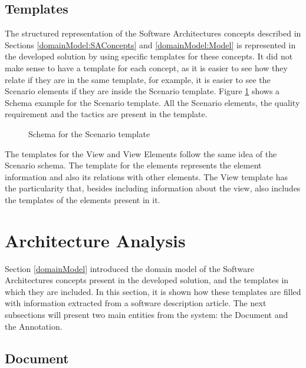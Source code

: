 \documentclass{llncs}
\begin{document}
\subsection{Templates}
\label{domainModel:templates}
The structured representation of the Software Architectures concepts described in Sections \ref{domainModel:SAConcepts} and \ref{domainModel:Model} is represented in the developed solution by using specific templates for these concepts. It did not make sense to have a template for each concept, as it is easier to see how they relate if they are in the same template, for example, it is easier to see the Scenario elements if they are inside the Scenario template. Figure \ref{figure:scenarioTemplate} shows a Schema example for the Scenario template. All the Scenario elements, the quality requirement and the tactics are present in the template.

\begin{figure}
\centering

\caption{Schema for the Scenario template}
\label{figure:scenarioTemplate}
\end{figure}

The templates for the View and View Elements follow the same idea of the Scenario schema. The template for the elements represents the element information and also its relations with other elements. The View template has the particularity that, besides including information about the view, also includes the templates of the elements present in it.

\section{Architecture Analysis}
\label{architecture}
Section \ref{domainModel} introduced the domain model of the Software Architectures concepts present in the developed solution, and the templates in which they are included. In this section, it is shown how these templates are filled with information extracted from a software description article. The next subsections will present two main entities from the system: the Document and the Annotation.

\subsection{Document}
\label{architecture:Document}
\end{document}
